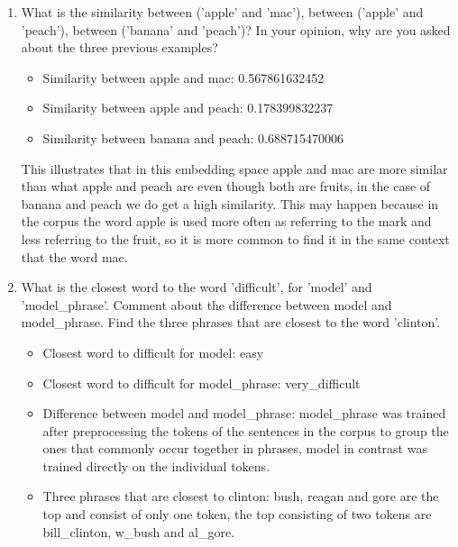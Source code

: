 \documentclass{article} %
\begin{document}
\begin{enumerate}
    \item
    What is the similarity between (’apple’ and ’mac’), between (’apple’ and ’peach’),
    between (’banana’ and ’peach’)? In your opinion, why are you asked about
    the three previous examples?

    \begin{itemize}
        \item
        Similarity between apple and mac: 0.567861632452

        \item
        Similarity between apple and peach: 0.178399832237

        \item
        Similarity between banana and peach: 0.688715470006
    \end{itemize}

    This illustrates that in this embedding space apple and mac are more similar than
    what apple and peach are even though both are fruits, in the case of banana and peach
    we do get a high similarity. This may happen because in the corpus the word apple
    is used more often as referring to the mark and less referring to the fruit, so it
    is more common to find it in the same context that the word mac.

    \item
    What is the closest word to the word 'difficult', for 'model' and 'model\_phrase'.
    Comment about the difference between model and model\_phrase. Find the three phrases
    that are closest to the word 'clinton'.

    \begin{itemize}
        \item
        Closest word to difficult for model: easy

        \item
        Closest word to difficult for model\_phrase: very\_difficult

        \item
        Difference between model and model\_phrase: model\_phrase was trained after
        preprocessing the tokens of the sentences in the corpus to group the ones
        that commonly occur together in phrases, model in contrast was trained
        directly on the individual tokens.

        \item
        Three phrases that are closest to clinton: bush, reagan and gore are the top
        and consist of only one token, the top consisting of two tokens are
        bill\_clinton, w\_bush and al\_gore.
    \end{itemize}


\end{enumerate}
\end{document}
